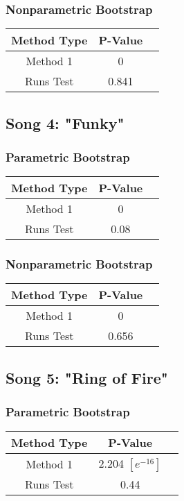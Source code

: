 \documentclass[12pt, letterpaper]{article}
\begin{document}
\subsubsection{Nonparametric Bootstrap}
\begin{tabular}{|c|c|c|}
\hline
\textbf{Method Type} & P-Value \\
\hline
Method 1 & 0  \\
\hline
Runs Test & 0.841 \\ 
\hline
\end{tabular}

\subsection{Song 4: "Funky"}
\subsubsection{Parametric Bootstrap}

\begin{tabular}{|c|c|c|}
\hline
\textbf{Method Type} & P-Value \\
\hline
Method 1 & 0 \\
\hline
Runs Test & 0.08  \\ 
\hline
\end{tabular}

\subsubsection{Nonparametric Bootstrap}
\begin{tabular}{|c|c|c|}
\hline
\textbf{Method Type} & P-Value \\
\hline
Method 1 & 0  \\
\hline
Runs Test & 0.656 \\ 
\hline
\end{tabular}

\subsection{Song 5: "Ring of Fire"}
\subsubsection{Parametric Bootstrap}

\begin{tabular}{|c|c|c|}
\hline
\textbf{Method Type} & P-Value  \\
\hline
Method 1 & 2.204 $[e^{-16}]$ \\
\hline
Runs Test & 0.44 \\ 
\hline
\end{tabular}
\end{document}
